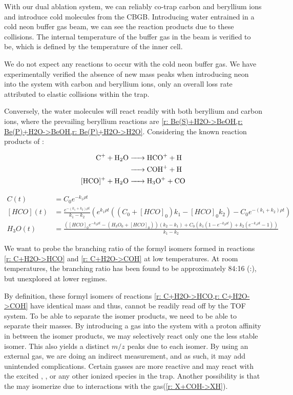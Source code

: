 With our dual ablation system, we can reliably co-trap carbon and beryllium ions and introduce cold molecules from the CBGB. Introducing water entrained in a cold neon buffer gas beam, we can see the reaction products due to these collisions. The internal temperature of the buffer gas in the beam is verified to be, which is defined by the temperature of the inner cell.

We do not expect any reactions to occur with the cold neon buffer gas. We have experimentally verified the absence of new mass peaks when introducing neon into the system with carbon and beryllium ions, only an overall loss rate attributed to elastic collisions within the trap. 

Conversely, the water molecules will react readily with both beryllium and carbon ions, where the prevailing beryllium reactions are \cref{r: Be(S)+H2O->BeOH,r: Be(P)+H2O->BeOH,r: Be(P)+H2O->H2O}. Considering the known reaction products of :

\begin{align}
	\ce{C+ + H2O & -> HCO+ + H} \label{r: C+H2O->HCO} \\
	\ce{& -> COH+ + H} \label{r: C+H2O->COH} \\
	\ce{[HCO]+ + H2O & -> H3O+ + CO} \label{r: [HCO]+H2O->H3O}
\end{align}

\begin{align}
	C(t) & = C_0 e^{-k_1 \rho t} \label{eq: C(t)+H2O} \\
	[HCO](t) & = \frac{e^{-(k_1 + k_2) \rho t}}{k_1 - k_2} \left(e^{k_1 \rho t}((C_0 + [HCO]_0)k_1 - [HCO]_0 k_2) - C_0 e^{-(k_1 + k_2) \rho t}\right) \label{eq: C+H2O->[HCO](t)} \\
	H_3O(t) & = \frac{\left([HCO]_0 e^{-k_2 \rho t} - (H_3O_0 + [HCO]_0) \right)(k_2 - k_1) + C_0\left( k_1 \left(1 - e^{-k_2 \rho t}\right) + k_2 \left(e^{-k_1 \rho t} - 1\right) \right)}{k_1 - k_2} \label{eq: [HCO]+H2O->H3O(t)}
\end{align}

We want to probe the branching ratio of the formyl isomers formed in reactions \ref{r: C+H2O->HCO} and \ref{r: C+H2O->COH} at low temperatures. At room temperatures, the branching ratio has been found to be approximately 84:16 (:)\cite{Freeman1987}, but unexplored at lower regimes.

By definition, these formyl isomers of reactions \cref{r: C+H2O->HCO,r: C+H2O->COH} have identical mass and thus, cannot be readily read off by the TOF system. To be able to separate the isomer products, we need to be able to separate their masses. By introducing a gas into the system with a proton affinity in between the isomer products, we may selectively react only one the less stable  isomer. This also yields a distinct $m/z$ peaks due to each isomer. By using an external gas, we are doing an indirect measurement, and as such, it may add unintended complications. Certain gasses are more reactive and may react with the excited , , or any other ionized species in the trap. Another possibility is that the  may isomerize due to interactions with the gas(\ref{r: X+COH->XH}).\cite{Love1987}

